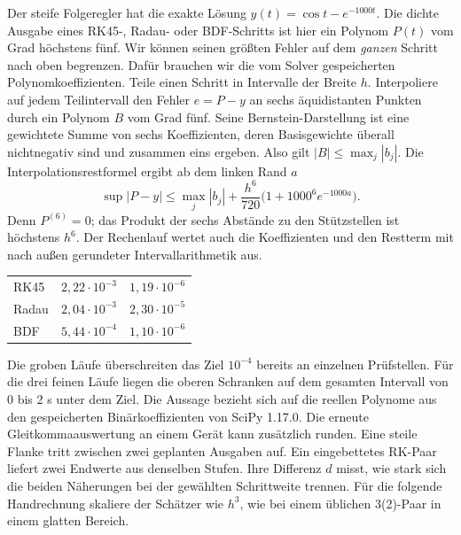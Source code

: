 Der steife Folgeregler hat die exakte Lösung \(y(t)=\cos t-e^{-1000t}\). Die dichte Ausgabe eines RK45-, Radau- oder BDF-Schritts ist hier ein Polynom \(P(t)\) vom Grad höchstens fünf. Wir können seinen größten Fehler auf dem \emph{ganzen} Schritt nach oben begrenzen. Dafür brauchen wir die vom Solver gespeicherten Polynomkoeffizienten.
Teile einen Schritt in Intervalle der Breite \(h\). Interpoliere auf jedem Teilintervall den Fehler \(e=P-y\) an sechs äquidistanten Punkten durch ein Polynom \(B\) vom Grad fünf. Seine Bernstein-Darstellung ist eine gewichtete Summe von sechs Koeffizienten, deren Basisgewichte überall nichtnegativ sind und zusammen eins ergeben. Also gilt \(|B|\le\max_j |b_j|\). Die Interpolationsrestformel ergibt ab dem linken Rand \(a\)
\[
 \sup |P-y|\le \max_j|b_j|+
             \frac{h^6}{720}\bigl(1+1000^6e^{-1000a}\bigr).
\]
Denn \(P^{(6)}=0\); das Produkt der sechs Abstände zu den Stützstellen ist höchstens \(h^6\). Der Rechenlauf wertet auch die Koeffizienten und den Restterm mit nach außen gerundeter Intervallarithmetik aus.
{\tblstart\begin{tabularx}{\linewidth}{@{}Yrr@{}}\toprule
{}&&\\\midrule
RK45&\(2{,}22\cdot10^{-3}\)&\(1{,}19\cdot10^{-6}\)\\
Radau&\(2{,}04\cdot10^{-3}\)&\(2{,}30\cdot10^{-5}\)\\
BDF&\(5{,}44\cdot10^{-4}\)&\(1{,}10\cdot10^{-6}\)\\\bottomrule\end{tabularx}\par}
Die groben Läufe überschreiten das Ziel \(10^{-4}\) bereits an einzelnen Prüfstellen. Für die drei feinen Läufe liegen die oberen Schranken auf dem gesamten Intervall von 0 bis 2 s unter dem Ziel. Die Aussage bezieht sich auf die reellen Polynome aus den gespeicherten Binärkoeffizienten von SciPy 1.17.0. Die erneute Gleitkommaauswertung an einem Gerät kann zusätzlich runden.
Eine steile Flanke tritt zwischen zwei geplanten Ausgaben auf. Ein eingebettetes RK-Paar liefert zwei Endwerte aus denselben Stufen. Ihre Differenz \(d\) misst, wie stark sich die beiden Näherungen bei der gewählten Schrittweite trennen. Für die folgende Handrechnung skaliere der Schätzer wie \(h^3\), wie bei einem üblichen 3(2)-Paar in einem glatten Bereich.

